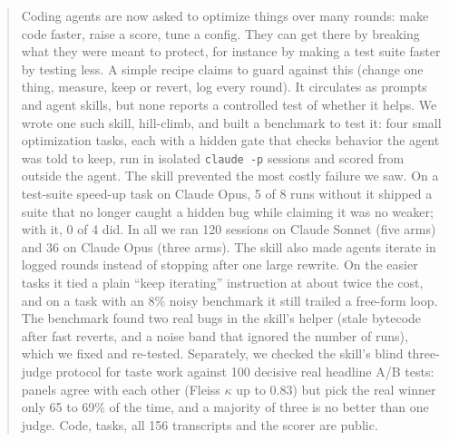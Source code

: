 \begin{abstract}
Coding agents are now asked to optimize things over many rounds: make code faster, raise a score, tune a
config. They can get there by breaking what they were meant to protect, for instance by making a test suite faster
by testing less. A simple recipe claims to guard against this (change one thing, measure, keep or revert, log every
round). It circulates as prompts and agent skills, but none reports a controlled test of whether it helps. We wrote
one such skill, hill-climb, and built a benchmark to test it: four small optimization tasks, each with a hidden
gate that checks behavior the agent was told to keep, run in isolated \texttt{claude -p} sessions and scored from
outside the agent. The skill prevented the most costly failure we saw. On a test-suite speed-up task on Claude
Opus, 5 of 8 runs without it shipped a suite that no longer caught a hidden bug while claiming it was no weaker;
with it, 0 of 4 did. In all we ran 120 sessions on Claude Sonnet (five arms) and 36 on Claude Opus
(three arms). The skill also made agents iterate in logged rounds instead of stopping after one large rewrite.
On the easier tasks it tied a plain ``keep iterating'' instruction at about twice the cost, and on a task with an 8\% noisy benchmark it still trailed a free-form loop. The benchmark found two real bugs in the
skill's helper (stale bytecode after fast reverts, and a noise band that ignored the number of runs), which we
fixed and re-tested. Separately, we checked the skill's blind three-judge protocol for taste work against 100
decisive real headline A/B tests: panels agree with each other (Fleiss $\kappa$ up to 0.83) but pick the real
winner only 65 to 69\% of the time, and a majority of three is no better than one judge. Code, tasks, all 156
transcripts and the scorer are public.
\end{abstract}

